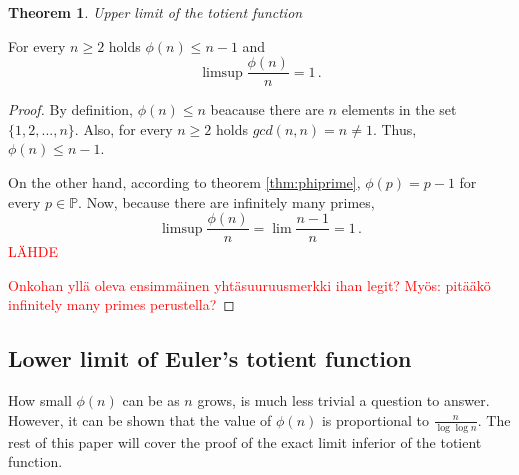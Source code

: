 \documentclass{article}
\theoremstyle{definition}
\newtheorem{theorem}[subsubsection]{Theorem}
\begin{document}
\begin{theorem}{\emph{Upper limit of the totient function}}

For every $n \geq 2$ holds $\phi(n) \leq n-1$ and
\begin{equation*}
    \limsup{\frac{\phi(n)}{n}} = 1\,.
\end{equation*}

\begin{proof}

By definition, $\phi(n) \leq n$ beacause there are $n$ elements in the set $\{1,2,...,n\}$. Also, for every $n \geq 2$ holds $gcd(n,n) = n \neq 1$. Thus, $\phi(n) \leq n-1$.

On the other hand, according to theorem \ref{thm:phiprime}, $\phi(p) = p-1$ for every $p\in\mathbb{P}$.
Now, because there are infinitely many primes,
\begin{equation*}
    \limsup{\frac{\phi(n)}{n}} = \lim \frac{n-1}{n} = 1\,.
\end{equation*}
\textcolor{red}{LÄHDE}

\textcolor{red}{Onkohan yllä oleva ensimmäinen yhtäsuuruusmerkki ihan legit? Myös: pitääkö infinitely many primes perustella?}

\end{proof}

\end{theorem}

\subsection{Lower limit of Euler's totient function}

How small $\phi(n)$ can be as $n$ grows, is much less trivial a question to answer. However, it can be shown that the value of $\phi(n)$ is proportional to $\frac{n}{\log\log n}$. The rest of this paper will cover the proof of the exact limit inferior of the totient function.
\end{document}
